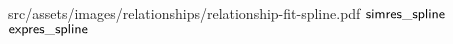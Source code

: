 
\relatplot
{src/assets/images/relationships/relationship-fit-spline.pdf}
{$\mathsf{simres\_spline}$}
{$\mathsf{expres\_spline}$}